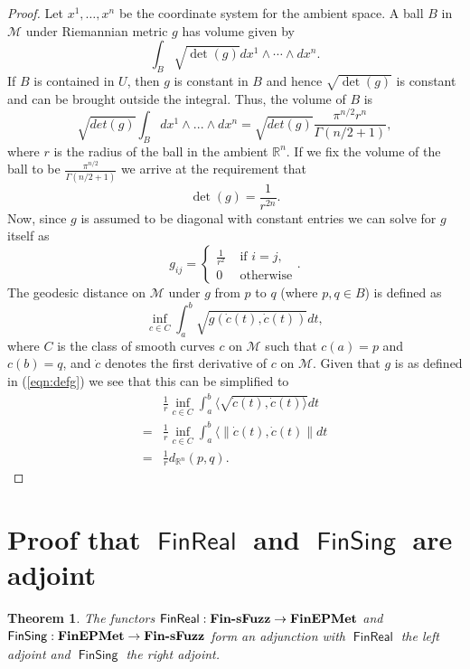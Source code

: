 \documentclass[12pt]{article}
\newtheorem{thm}{Theorem}
\DeclareMathOperator{\FinReal}{\mathsf{FinReal}}
\DeclareMathOperator{\FinSing}{\mathsf{FinSing}}
\begin{document}
\begin{proof}
Let $x^1, \ldots, x^n$ be the coordinate system for the ambient space. A ball $B$ in $\mathcal{M}$ under Riemannian metric $g$ has volume given by
\[
\int_B \sqrt{\det(g)} dx^1 \wedge \cdots \wedge dx^n .
\]
If $B$ is contained in $U$, then $g$ is constant in $B$ and hence $\sqrt{\det(g)}$ is constant and can be brought outside the integral. Thus, the volume of $B$ is
\[
\sqrt{det(g)}  \int_B dx^1 \wedge ... \wedge dx^n = \sqrt{det(g)} \frac{\pi^{n/2} r^n}{\Gamma(n/2 + 1)},
\]
where $r$ is the radius of the ball in the ambient $\mathbb{R}^n$. If we fix the volume of the ball to be $\frac{\pi^{n/2}}{\Gamma(n/2 + 1)}$ we arrive at the requirement that 
\[
\det(g) = \frac{1}{r^{2n}}.
\]
Now, since $g$ is assumed to be diagonal with constant entries we can solve for $g$ itself as
\begin{equation}\label{eqn:defg}
g_{ij} = \begin{cases}
        \frac{1}{r^2} & \text{ if } i = j,\\[8pt]
        0 & \text{ otherwise}
         \end{cases}.
\end{equation}
The geodesic distance on $\mathcal{M}$ under $g$ from $p$ to $q$ (where $p, q \in B$) is defined as
\[
\inf_{c\in C}\int_a^b \sqrt{g(\dot{c}(t),\dot{c}(t))} dt ,
\]
where $C$ is the class of smooth curves $c$ on $\mathcal{M}$ such that $c(a) = p$ and $c(b) = q$, and $\dot{c}$ denotes the first derivative of $c$ on $\mathcal{M}$. Given that $g$ is as defined in (\ref{eqn:defg}) we see that this can be simplified to
\begin{equation}
    \begin{split}
        &\frac{1}{r}\inf_{c\in C}\int_a^b \langle \sqrt{\dot{c}(t),\dot{c}(t)\rangle} dt\\
        =& \frac{1}{r}\inf_{c\in C}\int_a^b \langle \|\dot{c}(t),\dot{c}(t)\| dt\\
        =& \frac{1}{r} d_{\mathbb{R}^n}(p, q).
    \end{split}
\end{equation}
\end{proof}

\section{Proof that $\FinReal$ and $\FinSing$ are adjoint}

\begin{thm}
The functors $\FinReal:\text{\rm \bf Fin-sFuzz}\to\mathbf{FinEPMet}$ and $\FinSing:\mathbf{FinEPMet}\to \text{\rm \bf Fin-sFuzz}$ form an adjunction with $\FinReal$ the left adjoint and $\FinSing$ the right adjoint.
\end{thm}
\end{document}
